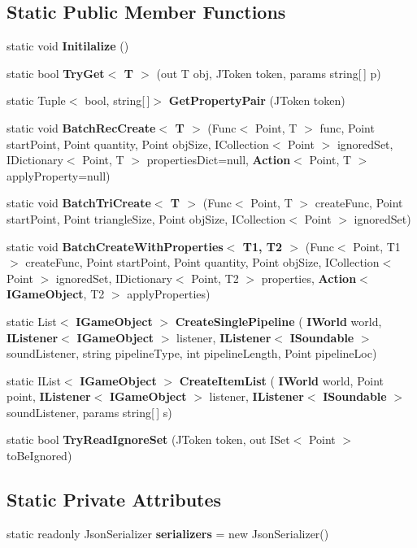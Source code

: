 \subsection*{Static Public Member Functions}
\begin{DoxyCompactItemize}
\item 
static void \textbf{ Initilalize} ()
\item 
static bool \textbf{ Try\+Get$<$ T $>$} (out T obj, J\+Token token, params string[$\,$] p)
\item 
static Tuple$<$ bool, string[$\,$]$>$ \textbf{ Get\+Property\+Pair} (J\+Token token)
\item 
static void \textbf{ Batch\+Rec\+Create$<$ T $>$} (Func$<$ Point, T $>$ func, Point start\+Point, Point quantity, Point obj\+Size, I\+Collection$<$ Point $>$ ignored\+Set, I\+Dictionary$<$ Point, T $>$ properties\+Dict=null, \textbf{ Action}$<$ Point, T $>$ apply\+Property=null)
\item 
static void \textbf{ Batch\+Tri\+Create$<$ T $>$} (Func$<$ Point, T $>$ create\+Func, Point start\+Point, Point triangle\+Size, Point obj\+Size, I\+Collection$<$ Point $>$ ignored\+Set)
\item 
static void \textbf{ Batch\+Create\+With\+Properties$<$ T1, T2 $>$} (Func$<$ Point, T1 $>$ create\+Func, Point start\+Point, Point quantity, Point obj\+Size, I\+Collection$<$ Point $>$ ignored\+Set, I\+Dictionary$<$ Point, T2 $>$ properties, \textbf{ Action}$<$ \textbf{ I\+Game\+Object}, T2 $>$ apply\+Properties)
\item 
static List$<$ \textbf{ I\+Game\+Object} $>$ \textbf{ Create\+Single\+Pipeline} (\textbf{ I\+World} world, \textbf{ I\+Listener}$<$ \textbf{ I\+Game\+Object} $>$ listener, \textbf{ I\+Listener}$<$ \textbf{ I\+Soundable} $>$ sound\+Listener, string pipeline\+Type, int pipeline\+Length, Point pipeline\+Loc)
\item 
static I\+List$<$ \textbf{ I\+Game\+Object} $>$ \textbf{ Create\+Item\+List} (\textbf{ I\+World} world, Point point, \textbf{ I\+Listener}$<$ \textbf{ I\+Game\+Object} $>$ listener, \textbf{ I\+Listener}$<$ \textbf{ I\+Soundable} $>$ sound\+Listener, params string[$\,$] s)
\item 
static bool \textbf{ Try\+Read\+Ignore\+Set} (J\+Token token, out I\+Set$<$ Point $>$ to\+Be\+Ignored)
\end{DoxyCompactItemize}
\subsection*{Static Private Attributes}
\begin{DoxyCompactItemize}
\item 
static readonly Json\+Serializer \textbf{ serializers} = new Json\+Serializer()
\end{DoxyCompactItemize}


